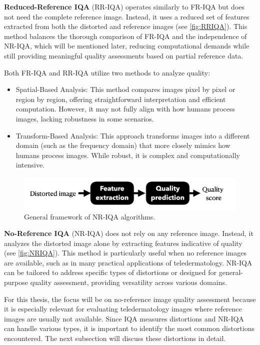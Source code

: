 \noindent
\textbf{Reduced-Reference IQA} (RR-IQA) operates similarly to FR-IQA but does not need the complete reference image. Instead, it uses a reduced set of features extracted from both the distorted and reference images (see \autoref{fig:RRIQA}). This method balances the thorough comparison of FR-IQA and the independence of NR-IQA, which will be mentioned later, reducing computational demands while still providing meaningful quality assessments based on partial reference data. \par
\vspace{\baselineskip}
\noindent
Both FR-IQA and RR-IQA utilize two methods to analyze quality:
\begin{itemize}
    \item Spatial-Based Analysis: This method compares images pixel by pixel or region by region, offering straightforward interpretation and efficient computation. However, it may not fully align with how humans process images, lacking robustness in some scenarios.
    \item Transform-Based Analysis: This approach transforms images into a different domain (such as the frequency domain) that more closely mimics how humans process images. While robust, it is complex and computationally intensive.
\end{itemize}
\vspace{\baselineskip}
\begin{figure}[ht]
    \centering
    \includegraphics[keepaspectratio,width=15cm]{img/NRIQA.jpg}
    \caption{General framework of NR-IQA algorithms.}
    \label{fig:NRIQA}
\end{figure}
\noindent
\textbf{No-Reference IQA} (NR-IQA) does not rely on any reference image. Instead, it analyzes the distorted image alone by extracting features indicative of quality (see \autoref{fig:NRIQA}). This method is particularly useful when no reference images are available, such as in many practical applications of teledermatology. NR-IQA can be tailored to address specific types of distortions or designed for general-purpose quality assessment, providing versatility across various domains. \par
\vspace{\baselineskip}
\noindent
For this thesis, the focus will be on no-reference image quality assessment because it is especially relevant for evaluating teledermatology images where reference images are usually not available. Since IQA measures distortions and NR-IQA can handle various types, it is important to identify the most common distortions encountered. The next subsection will discuss these distortions in detail. \par

